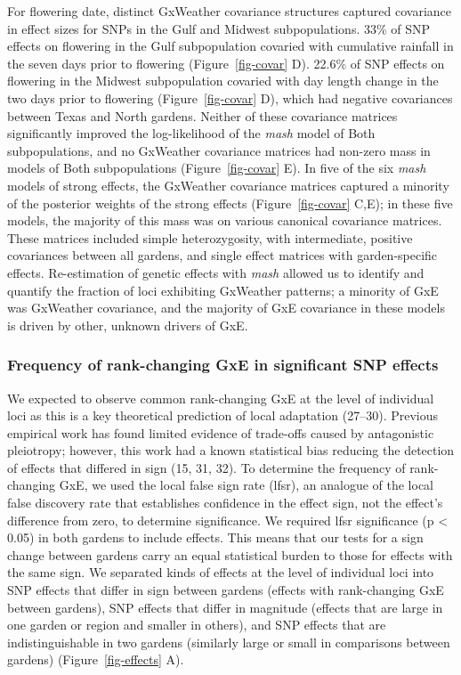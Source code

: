 \documentclass[
  9pt,
  twocolumn,
  twoside]{pnas-new}
\begin{document}
For flowering date, distinct GxWeather covariance structures captured
covariance in effect sizes for SNPs in the Gulf and Midwest
subpopulations. 33\% of SNP effects on flowering in the Gulf
subpopulation covaried with cumulative rainfall in the seven days prior
to flowering (Figure~\ref{fig-covar} D). 22.6\% of SNP effects on
flowering in the Midwest subpopulation covaried with day length change
in the two days prior to flowering (Figure~\ref{fig-covar} D), which had
negative covariances between Texas and North gardens. Neither of these
covariance matrices significantly improved the log-likelihood of the
\emph{mash} model of Both subpopulations, and no GxWeather covariance
matrices had non-zero mass in models of Both subpopulations
(Figure~\ref{fig-covar} E). In five of the six \emph{mash} models of
strong effects, the GxWeather covariance matrices captured a minority of
the posterior weights of the strong effects (Figure~\ref{fig-covar}
C,E); in these five models, the majority of this mass was on various
canonical covariance matrices. These matrices included simple
heterozygosity, with intermediate, positive covariances between all
gardens, and single effect matrices with garden-specific effects.
Re-estimation of genetic effects with \emph{mash} allowed us to identify
and quantify the fraction of loci exhibiting GxWeather patterns; a
minority of GxE was GxWeather covariance, and the majority of GxE
covariance in these models is driven by other, unknown drivers of GxE.

\subsubsection{Frequency of rank-changing GxE in significant SNP
effects}\label{frequency-of-rank-changing-gxe-in-significant-snp-effects}

We expected to observe common rank-changing GxE at the level of
individual loci as this is a key theoretical prediction of local
adaptation (27--30). Previous empirical work has found limited evidence
of trade-offs caused by antagonistic pleiotropy; however, this work had
a known statistical bias reducing the detection of effects that differed
in sign (15, 31, 32). To determine the frequency of rank-changing GxE,
we used the local false sign rate (lfsr), an analogue of the local false
discovery rate that establishes confidence in the effect sign, not the
effect's difference from zero, to determine significance. We required
lfsr significance (p \textless{} 0.05) in both gardens to include
effects. This means that our tests for a sign change between gardens
carry an equal statistical burden to those for effects with the same
sign. We separated kinds of effects at the level of individual loci into
SNP effects that differ in sign between gardens (effects with
rank-changing GxE between gardens), SNP effects that differ in magnitude
(effects that are large in one garden or region and smaller in others),
and SNP effects that are indistinguishable in two gardens (similarly
large or small in comparisons between gardens) (Figure~\ref{fig-effects}
A).
\end{document}
